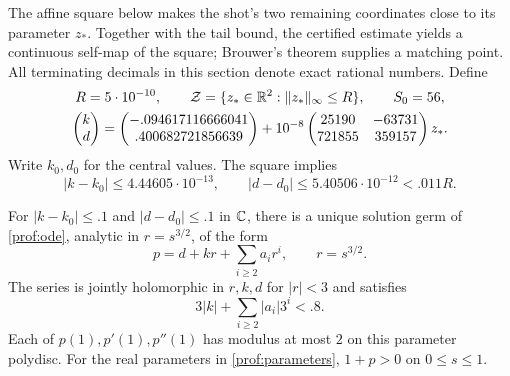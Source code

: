 The affine square below makes the shot's two remaining coordinates
close to its parameter \(z_*\).  Together with the tail bound, the
certified estimate yields a continuous self-map of the square;
Brouwer's theorem supplies a matching point.  All terminating
decimals in this section denote exact rational numbers.  Define
\begin{equation}\label{prof:parameters}
 \begin{gathered}
 R=5\cdot10^{-10},\qquad
 \mathcal Z=\{z_*\in\mathbb{R}^2:\lVert z_*\rVert_\infty\le R\},\qquad S_0=56,\\
 \begin{pmatrix}k\\d\end{pmatrix}
 =\begin{pmatrix}-.094617116666041\\ .400682721856639\end{pmatrix}
 +10^{-8}
 \begin{pmatrix}25190&-63731\\721855&359157\end{pmatrix}z_*.
 \end{gathered}
\end{equation}
Write $k_0,d_0$ for the central values.  The square implies
\begin{equation}\label{prof:parameter-displacement}
 |k-k_0|\le4.44605\cdot10^{-13},\qquad
 |d-d_0|\le5.40506\cdot10^{-12}<.011R.
\end{equation}

\begin{lemma}\label{prof:origin}
For $|k-k_0|\le .1$ and $|d-d_0|\le .1$ in $\mathbb{C}$, there is a unique
solution germ of \eqref{prof:ode}, analytic in $r=s^{3/2}$, of the form
\begin{equation}\label{prof:origin-series}
 p=d+kr+\sum_{i\ge2}a_ir^i,\qquad r=s^{3/2}.
\end{equation}
The series is jointly holomorphic in $r,k,d$ for $|r|<3$ and satisfies
\begin{equation}\label{prof:origin-majorant}
 3|k|+\sum_{i\ge2}|a_i|3^i<.8.
\end{equation}
Each of $p(1),p'(1),p''(1)$ has modulus at most $2$ on this parameter
polydisc.  For the real parameters in \eqref{prof:parameters}, $1+p>0$
on $0\le s\le1$.
\end{lemma}

